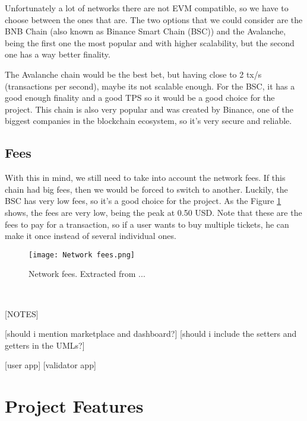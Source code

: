 Unfortunately a lot of networks there are not EVM compatible, so we have to choose between the ones that are. The two options that we could consider are the BNB Chain (also known as Binance Smart Chain (BSC)) and the Avalanche, being the first one the most popular and with higher scalability, but the second one has a way better finality.

The Avalanche chain would be the best bet, but having close to 2 tx/s (transactions per second), maybe its not scalable enough. For the BSC, it has a good enough finality and a good TPS so it would be a good choice for the project. This chain is also very popular and was created by Binance, one of the biggest companies in the blockchain ecosystem, so it's very secure and reliable.

\subsection{Fees}
\label{subsec:fees}

With this in mind, we still need to take into account the network fees. If this chain had big fees, then we would be forced to switch to another. Luckily, the BSC has very low fees, so it's a good choice for the project. As the Figure \ref{fig:network_fees} shows, the fees are very low, being the peak at 0.50 USD. Note that these are the fees to pay for a transaction, so if a user wants to buy multiple tickets, he can make it once instead of several individual ones.

\begin{figure}[H]
    \texttt{[image: Network fees.png]}
    \centering
    \caption{Network fees. Extracted from ...}
    \label{fig:network_fees}
\end{figure}

~

[NOTES]

[should i mention marketplace and dashboard?]
[should i include the setters and getters in the UMLs?]

[user app]
[validator app]

\section{Project Features}
\label{sec:project_features}
